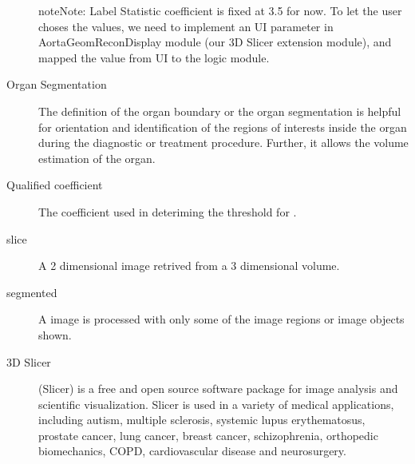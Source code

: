 \documentclass[letterpaper,10pt,english]{sphinxmanual}
\begin{document}
\begin{description}
\begin{sphinxadmonition}{note}{Note:}
\sphinxAtStartPar
Label Statistic coefficient is fixed at 3.5 for now. To let the user choses the values, we need to implement an UI parameter in AortaGeomReconDisplay module (our 3D Slicer extension module), and mapped the value from UI to the logic module.
\end{sphinxadmonition}

\item[{Organ Segmentation\index{Organ Segmentation@\spxentry{Organ Segmentation}|spxpagem}\phantomsection\label{\detokenize{glossary:term-Organ-Segmentation}}}] \leavevmode
\sphinxAtStartPar
The definition of the organ boundary or the organ segmentation is helpful for orientation and identification of the regions of interests inside the organ during the diagnostic or treatment procedure. Further, it allows the volume estimation of the organ.

\item[{Qualified coefficient\index{Qualified coefficient@\spxentry{Qualified coefficient}|spxpagem}\phantomsection\label{\detokenize{glossary:term-Qualified-coefficient}}}] \leavevmode
\sphinxAtStartPar
The coefficient used in deteriming the threshold for .

\item[{slice\index{slice@\spxentry{slice}|spxpagem}\phantomsection\label{\detokenize{glossary:term-slice}}}] \leavevmode
\sphinxAtStartPar
A 2 dimensional image retrived from a 3 dimensional volume.

\item[{segmented\index{segmented@\spxentry{segmented}|spxpagem}\phantomsection\label{\detokenize{glossary:term-segmented}}}] \leavevmode
\sphinxAtStartPar
A image is processed with only some of the image regions or image objects shown.

\item[{3D Slicer\index{3D Slicer@\spxentry{3D Slicer}|spxpagem}\phantomsection\label{\detokenize{glossary:term-3D-Slicer}}}] \leavevmode
\sphinxAtStartPar
{} (Slicer) is a free and open source software package for image analysis and scientific visualization. Slicer is used in a variety of medical applications, including autism, multiple sclerosis, systemic lupus erythematosus, prostate cancer, lung cancer, breast cancer, schizophrenia, orthopedic biomechanics, COPD, cardiovascular disease and neurosurgery.

\end{description}
\end{document}
